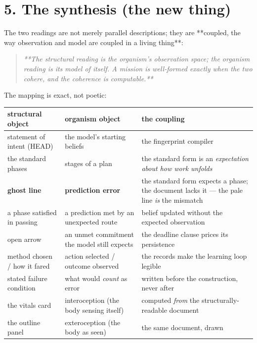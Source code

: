 \documentclass[11pt,oneside]{article}
\begin{document}
\section*{5. The synthesis (the new thing)}

The two readings are not merely parallel descriptions; they are **coupled,
the way observation and model are coupled in a living thing**:

\begin{quote}\itshape
**The structural reading is the organism's observation space; the organism
reading is its model of itself. A mission is well-formed exactly when the two cohere,
and the coherence is computable.**
\end{quote}

The mapping is exact, not poetic:

\begin{center}\small\begin{tabularx}{\textwidth}{YYY}
\toprule
structural object & organism object & the coupling \\
\midrule
statement of intent (HEAD) & the model's starting beliefs & the fingerprint compiler \\
the standard phases & stages of a plan & the standard form is an \emph{expectation about how work unfolds} \\
\textbf{ghost line} & \textbf{prediction error} & the standard form expects a phase; the document lacks it --- the pale line \emph{is} the mismatch \\
a phase satisfied in passing & a prediction met by an unexpected route & belief updated without the expected observation \\
open arrow & an unmet commitment the model still expects & the deadline clause prices its persistence \\
method chosen / how it fared & action selected / outcome observed & the records make the learning loop legible \\
stated failure condition & what would \emph{count} as error & written before the construction, never after \\
the vitals card & interoception (the body sensing itself) & computed \emph{from} the structurally-readable document \\
the outline panel & exteroception (the body as seen) & the same document, drawn \\
\bottomrule
\end{tabularx}\end{center}
\end{document}
